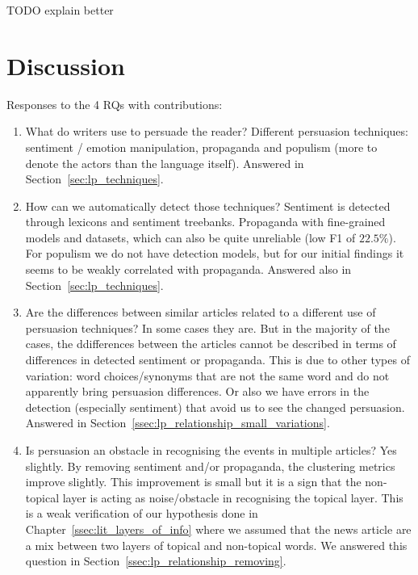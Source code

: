 TODO explain better


\section{\statusorange Discussion}

Responses to the 4 RQs with contributions:

\begin{enumerate}
    \item What do writers use to persuade the reader? Different persuasion techniques: sentiment / emotion manipulation, propaganda and populism (more to denote the actors than the language itself). Answered in Section~\ref{sec:lp_techniques}.
    \item How can we automatically detect those techniques? Sentiment is detected through lexicons and sentiment treebanks. Propaganda with fine-grained models and datasets, which can also be quite unreliable (low F1 of $22.5\%$). For populism we do not have detection models, but for our initial findings it seems to be weakly correlated with propaganda. Answered also in Section~\ref{sec:lp_techniques}.
    \item Are the differences between similar articles related to a different use of persuasion techniques? In some cases they are. But in the majority of the cases, the ddifferences between the articles cannot be described in terms of differences in detected sentiment or propaganda. This is due to other types of variation: word choices/synonyms that are not the same word and do not apparently bring persuasion differences. Or also we have errors in the detection (especially sentiment) that avoid us to see the changed persuasion. Answered in Section~\ref{ssec:lp_relationship_small_variations}.
    \item Is persuasion an obstacle in recognising the events in multiple articles? Yes slightly. By removing sentiment and/or propaganda, the clustering metrics improve slightly. This improvement is small but it is a sign that the non-topical layer is acting as noise/obstacle in recognising the topical layer. This is a weak verification of our hypothesis done in Chapter~\ref{ssec:lit_layers_of_info} where we assumed that the news article are a mix between two layers of topical and non-topical words.  We answered this question in Section~\ref{ssec:lp_relationship_removing}.
\end{enumerate}

